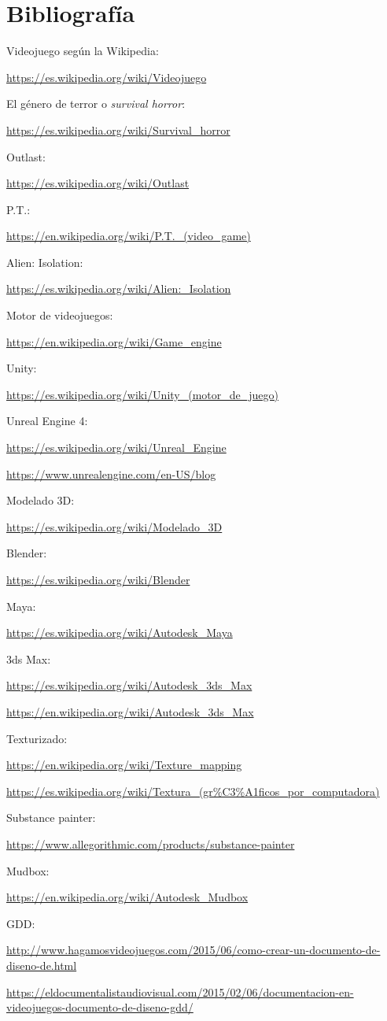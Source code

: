 \chapter{Bibliografía}
\label{bibliografia}

Videojuego según la Wikipedia:

\url{https://es.wikipedia.org/wiki/Videojuego}

El género de terror o \textit{survival horror}:

\url{https://es.wikipedia.org/wiki/Survival_horror}

Outlast:

\url{https://es.wikipedia.org/wiki/Outlast}

P.T.:

\url{https://en.wikipedia.org/wiki/P.T._(video_game)}

Alien: Isolation:

\url{https://es.wikipedia.org/wiki/Alien:_Isolation}

Motor de videojuegos:

\url{https://en.wikipedia.org/wiki/Game_engine}

Unity:

\url{https://es.wikipedia.org/wiki/Unity_(motor_de_juego)}

Unreal Engine 4:

\url{https://es.wikipedia.org/wiki/Unreal_Engine}

\url{https://www.unrealengine.com/en-US/blog}

Modelado 3D:

\url{https://es.wikipedia.org/wiki/Modelado_3D}

Blender:

\url{https://es.wikipedia.org/wiki/Blender}

Maya:

\url{https://es.wikipedia.org/wiki/Autodesk_Maya}

3ds Max:

\url{https://es.wikipedia.org/wiki/Autodesk_3ds_Max}

\url{https://en.wikipedia.org/wiki/Autodesk_3ds_Max}

Texturizado:

\url{https://en.wikipedia.org/wiki/Texture_mapping}

\url{https://es.wikipedia.org/wiki/Textura_(gr%C3%A1ficos_por_computadora)}
	
Substance painter:

\url{https://www.allegorithmic.com/products/substance-painter}

Mudbox:

\url{https://en.wikipedia.org/wiki/Autodesk_Mudbox}

GDD:

\url{http://www.hagamosvideojuegos.com/2015/06/como-crear-un-documento-de-diseno-de.html}

\url{https://eldocumentalistaudiovisual.com/2015/02/06/documentacion-en-videojuegos-documento-de-diseno-gdd/}
